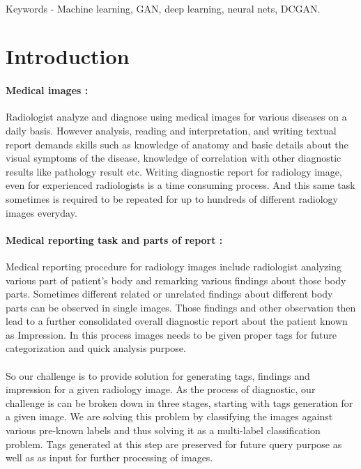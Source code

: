 \documentclass[12pt]{article}
\numberwithin{figure}{section}
\begin{document}
\\
Keywords - Machine learning, GAN, deep learning, neural nets, DCGAN.
\\
\clearpage
\tableofcontents
\clearpage
\listoffigures 
\listoftables
\clearpage
{}
\section{Introduction}
\paragraph{Medical images : }
Radiologist analyze and diagnose using medical images for various diseases on a daily basis. However analysis, reading and interpretation, and writing textual report demands skills such as knowledge of anatomy and basic details about the visual symptoms of the disease, knowledge of correlation with other diagnostic results like pathology result etc.
Writing diagnostic report for radiology image, even for experienced radiologists is a time consuming process. And this same task sometimes is required to be repeated for up to hundreds of different radiology images everyday.
\paragraph{Medical reporting task and parts of report : }
Medical reporting procedure for radiology images include radiologist analyzing various part of patient’s body and remarking various findings about those body parts. Sometimes different related or unrelated findings about different body parts can be observed in single images. Those findings and other observation then lead to a further consolidated overall diagnostic report about the patient known as Impression. In this process images needs to be given proper tags for future categorization and quick analysis purpose.
\paragraph{}
So our challenge is to provide solution for generating tags, findings and impression for a given radiology image. As the process of diagnostic, our challenge is can be broken down in three stages, starting with tags generation for a given image. We are solving this problem by classifying the images against various pre-known labels and thus solving it as a multi-label classification problem. Tags generated at this step are preserved for future query purpose as well as as input for further processing of images. 
\end{document}
